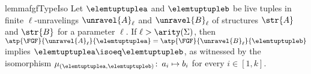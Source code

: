 \ifmainpart
\begin{restatable}{lemma}{fgfTypeIso}\label{lem:fgf-type-iso}
  Let $\elemtuptuplea$ and $\elemtuptupleb$ be live tuples in finite $\ell$-unravelings $\unravel{A}_{\ell}$ and $\unravel{B}_{\ell}$ of structures $\str{A}$ and $\str{B}$ for a parameter $\ell$.
  If $\ell > \arity(\Sigma)$, then $\atp{\FGF}{\unravel{A}_{\ell}}{\elemtuptuplea} = \atp{\FGF}{\unravel{B}_{\ell}}{\elemtuptupleb}$ implies $\elemtuptuplea \isoeq \elemtuptupleb$, as witnessed by the isomorphism $\mu_{(\elemtuptuplea, \elemtuptupleb)}\colon\, a_{i} \mapsto b_{i}$ for every $i \in [1, k]$.
\end{restatable}
